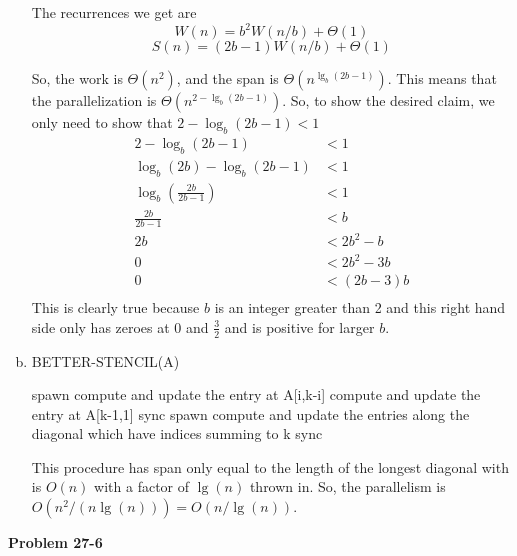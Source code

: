 \documentclass{article}
\begin{document}
\begin{enumerate}[a.]
The recurrences we get are
\[
W(n) = b^2 W(n/b) + \Theta(1)
\]
\[
S(n) = (2b-1)W(n/b)+\Theta(1)
\]

So, the work is $\Theta(n^2)$, and the span is $\Theta(n^{\lg_b(2b-1)})$. This means that the parallelization is $\Theta(n^{2- \lg_b(2b-1)})$. So, to show the desired claim, we only need to show that $2-\log_b(2b-1)<1$
\begin{align*}
2-\log_b(2b-1)&<1\\
\log_b(2b)-\log_b(2b-1)&<1\\
\log_b\left(\frac{2b}{2b-1}\right)&<1\\
\frac{2b}{2b-1}&<b\\
2b&<2b^2 -b\\
0&<2b^2 -3b\\
0&<(2b -3)b\\
\end{align*}
This is clearly true because $b$ is an integer greater than 2 and this right hand side only has zeroes at 0 and $\frac{3}{2}$ and is positive for larger $b$.

\item
\begin{algorithm}
\caption{BETTER-STENCIL(A)}
\begin{algorithmic}
\State spawn compute and update the entry at A[i,k-i]
\EndFor
\State compute and update the entry at A[k-1,1]
\State sync
\EndFor
{}
\State spawn compute and update the entries along the diagonal which have indices summing to k
\EndFor
\State sync
\EndFor
\end{algorithmic}
\end{algorithm}

This procedure has span only equal to the length of the longest diagonal with is $O(n)$ with a factor of $\lg(n)$ thrown in. So, the parallelism is $O(n^2/(n\lg(n))) = O(n/\lg(n))$.
\end{enumerate}

\noindent\textbf{Problem 27-6}\\
\end{document}
